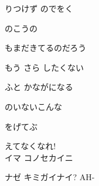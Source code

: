 りつけず のでをく

のこうの

もまだきてるのだろう

もう さら したくない

ふと かながになる

のいないこんな

をげてぶ

えてなくなれ!
\\

イマ コノセカイニ

ナゼ キミガイナイ? AH-
\\
